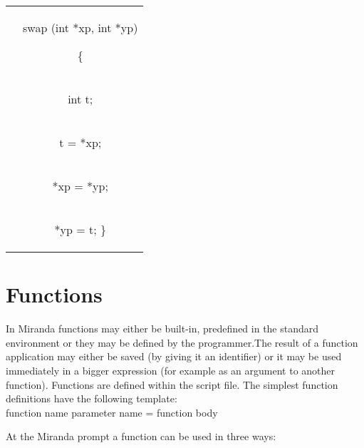 \documentclass[11pt]{article}
\begin{document}
\begin{center}
    

\begin{tabular}{|c c|}
\hline
{void &\begin{flushleft}

swap (int *xp, int *yp) \end{flushleft} \{ \\
 & \begin{flushleft}
 
int t; \end{flushleft}\\ 
  &\begin{flushleft}t = *xp; \end{flushleft}\\
  &\begin{flushleft}*xp = *yp; \end{flushleft}\\
  &\begin{flushleft}*yp = t; \} \end{flushleft} \\
  \hline
  
\end{tabular}  
  \end{center}
  

\section{Functions}

In  Miranda functions may either be built-in, predefined in the
standard environment or they may be defined by the programmer.The result of a function application may either be saved (by giving it an identifier) or it may be
used immediately in a bigger expression (for example as an argument to another
function). Functions are defined within the script file. The simplest function
definitions have the following template:\\

function name parameter name = function body \\
\begin{center}

    
\end{center} 


At the Miranda prompt a function  can be used in three ways:
\end{document}
